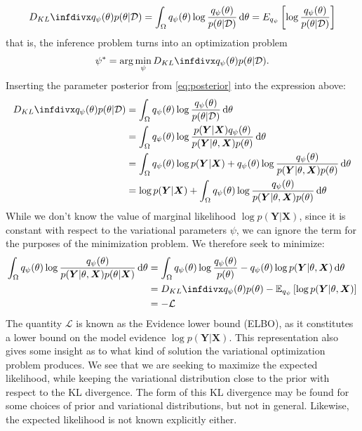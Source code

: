 \begin{align}
    \kld{q_\psi(\theta)}{p(\theta|\D)} 
    = \int_{\Omega} q_\psi(\theta)\log{\frac{q_\psi(\theta)}{p(\theta|\D)}} \dd{\theta} 
    = E_{q_\psi}\left[\log{\frac{q_\psi(\theta)}{p(\theta|\D)}}\right]
\end{align}
that is, the inference problem turns into an optimization problem 
\begin{align}
    \psi^\ast=\arg\min_{\psi}{\kld{q_\psi(\theta)}{p(\theta|\D)} }.
\end{align} 
Inserting the parameter posterior from \cref{eq:posterior} into the expression above:
\begin{align}
    \kld{q_\psi(\theta)}{p(\theta|\D)} 
    &= \int_{\Omega} q_\psi(\theta)\log{\frac{q_\psi(\theta)}{p(\theta|\D)}} \dd{\theta} \\
    &= \int_{\Omega} q_\psi(\theta)\log{\frac{p(\bm{Y}|\bm{X})q_\psi(\theta)}{p(\bm{Y} |\theta, \bm{X}) p(\theta)}} \dd{\theta} \\
    &= \int_{\Omega} q_\psi(\theta)\log{p(\bm Y|\bm{X})} + q_\psi(\theta)\log{\frac{q_\psi(\theta)}{p(\bm{Y} |\theta, \bm{X}) p(\theta)}} \dd{\theta} \\
    &= \log{p(\bm{Y}|\bm{X})} + \int_{\Omega} q_\psi(\theta)\log{\frac{q_\psi(\theta)}{p(\bm{Y} |\theta, \bm{X}) p(\theta)}} \dd{\theta} 
\end{align}
While we don't know the value of marginal likelihood $\log{p(\bm{Y}|\bm{X})}$, since it is constant with respect to the variational parameters $\psi$, we can ignore the term for the purposes of the minimization problem.
We therefore seek to minimize:
\begin{align} \label{eq:elbo}
    \int_{\Omega} q_\psi(\theta)\log{\frac{q_\psi(\theta)}{p(\bm{Y} |\theta, \bm{X}) p(\theta|\bm{X})}} \dd{\theta} 
    &= \int_{\Omega} q_\psi(\theta) \log{\frac{q_\psi(\theta)}{p(\theta)}} -q_\psi(\theta)\log{p(\bm{Y} |\theta, \bm{X})} \dd{\theta}\\
    &= \kld{q_\psi(\theta)}{p(\theta)}  - \E_{q_\psi}\left[ \log{p(\bm{Y} |\theta, \bm{X})}  \right]  \\
    &= -\mathcal{L}
\end{align}
The quantity $\mathcal{L}$ is known as the Evidence lower bound (ELBO), as it constitutes a lower bound on the model evidence $\log{p(\bm{Y}|\bm{X})}$. 
This representation also gives some insight as to what kind of solution the variational optimization problem produces. 
We see that we are seeking to maximize the expected likelihood, while keeping the variational distribution close to the prior with respect to the KL divergence.
The form of this KL divergence may be found for some choices of prior and variational distributions, but not in general.
Likewise, the expected likelihood is not known explicitly either.

